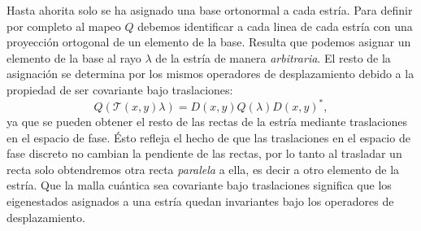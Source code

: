 \documentclass[a4paper,11pt]{report}
\begin{document}
  Hasta ahorita solo se ha asignado una base ortonormal a
  cada estría. Para definir por completo al mapeo $Q$
  debemos identificar a cada linea de cada estría con una
  proyección ortogonal de un elemento de la base. Resulta
  que podemos asignar un elemento de la base al rayo
  $\lambda$ de la estría de manera \textit{arbitraria}. El
  resto de la asignación se determina por los mismos
  operadores de desplazamiento debido a la propiedad de ser
  covariante bajo traslaciones:
  \[
    Q(\mathcal T(x,y) \lambda)
    = D(x,y) Q(\lambda) D(x,y)^{*},
  \] 
  ya que se pueden obtener el resto de las rectas de la
  estría mediante traslaciones en el espacio de fase. Ésto
  refleja el hecho de que las traslaciones en el espacio
  de fase discreto no cambian la pendiente de las rectas,
  por lo tanto al trasladar un recta solo obtendremos otra
  recta \textit{paralela} a ella, es decir a otro elemento
  de la estría. Que la malla cuántica sea covariante bajo
  traslaciones significa que los eigenestados asignados a
  una estría quedan invariantes bajo los operadores de
  desplazamiento. 
\end{document}
